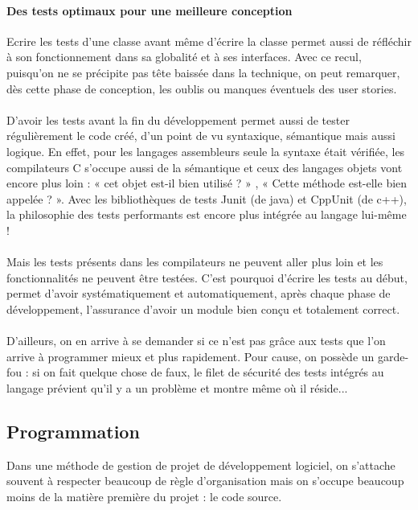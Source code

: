 \documentclass[]{article}
\let\oldparagraph\paragraph
\renewcommand{\paragraph}[1]{\oldparagraph{#1}\mbox{}}
\begin{document}
\hypertarget{des-tests-optimaux-pour-une-meilleure-conception}{%
\paragraph{Des tests optimaux pour une meilleure
conception}\label{des-tests-optimaux-pour-une-meilleure-conception}}

Ecrire les tests d'une classe avant même d'écrire la classe permet aussi
de réfléchir à son fonctionnement dans sa globalité et à ses interfaces.
Avec ce recul, puisqu'on ne se précipite pas tête baissée dans la
technique, on peut remarquer, dès cette phase de conception, les oublis
ou manques éventuels des user stories.\\
~\\
D'avoir les tests avant la fin du développement permet aussi de tester
régulièrement le code créé, d'un point de vu syntaxique, sémantique mais
aussi logique. En effet, pour les langages assembleurs seule la syntaxe
était vérifiée, les compilateurs C s'occupe aussi de la sémantique et
ceux des langages objets vont encore plus loin : « cet objet est-il bien
utilisé ? » , « Cette méthode est-elle bien appelée ? ». Avec les
bibliothèques de tests Junit (de java) et CppUnit (de c++), la
philosophie des tests performants est encore plus intégrée au langage
lui-même !\\
~\\
Mais les tests présents dans les compilateurs ne peuvent aller plus loin
et les fonctionnalités ne peuvent être testées. C'est pourquoi d'écrire
les tests au début, permet d'avoir systématiquement et automatiquement,
après chaque phase de développement, l'assurance d'avoir un module bien
conçu et totalement correct.\\
~\\
D'ailleurs, on en arrive à se demander si ce n'est pas grâce aux tests
que l'on arrive à programmer mieux et plus rapidement. Pour cause, on
possède un garde-fou : si on fait quelque chose de faux, le filet de
sécurité des tests intégrés au langage prévient qu'il y a un problème et
montre même où il réside...




\hypertarget{programmation}{%
\subsection{\texorpdfstring{\textbf{Programmation}}{Programmation}}\label{programmation}}

Dans une méthode de gestion de projet de développement logiciel, on
s'attache souvent à respecter beaucoup de règle d'organisation mais on
s'occupe beaucoup moins de la matière première du projet : le code
source.~
\end{document}
